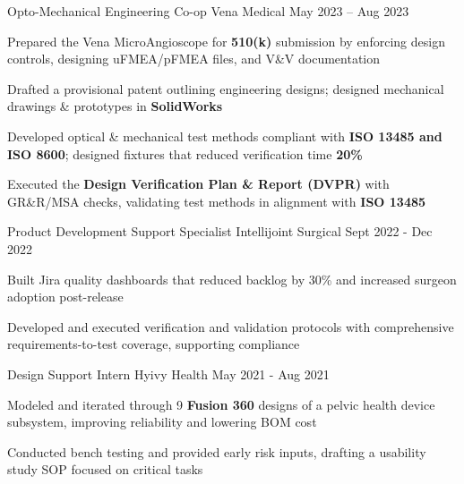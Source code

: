 \documentclass[11pt, a4paper]{russell}
\begin{document}
\begin{cventries}
\cventry
  {Opto-Mechanical Engineering Co-op} %
  {Vena Medical} %
  {} %
  {May 2023 -- Aug 2023} %
  {
    \begin{cvitems}
        \item {Prepared the Vena MicroAngioscope for \textbf{510(k)} submission by enforcing design controls, designing uFMEA/pFMEA files, and V\&V documentation}
        \item {Drafted a provisional patent outlining engineering designs; designed mechanical drawings \& prototypes in \textbf{SolidWorks}}
        \item {Developed optical \& mechanical test methods compliant with \textbf{ISO 13485 and ISO 8600}; designed fixtures that reduced verification time \textbf{20\%}}
        \item {Executed the \textbf{Design Verification Plan \& Report (DVPR)} with GR\&R/MSA checks, validating test methods in alignment with \textbf{ISO 13485}}
    \end{cvitems}
  }

\cventry
  {Product Development Support Specialist} %
  {Intellijoint Surgical} %
  {} %
  {Sept 2022 - Dec 2022} %
  {
    \begin{cvitems}
        \item {Built Jira quality dashboards that reduced backlog by 30\% and increased surgeon adoption post-release}
        \item {Developed and executed verification and validation protocols with comprehensive requirements-to-test coverage, supporting compliance}
    \end{cvitems}
  }

\cventry
  {Design Support Intern} %
  {Hyivy Health} %
  {} %
  {May 2021 - Aug 2021} %
  {
    \begin{cvitems}
        \item {Modeled and iterated through 9 \textbf{Fusion 360} designs of a pelvic health device subsystem, improving reliability and lowering BOM cost}
        \item {Conducted bench testing and provided early risk inputs, drafting a usability study SOP focused on critical tasks}
    \end{cvitems}
  }
\end{cventries}
\end{document}
